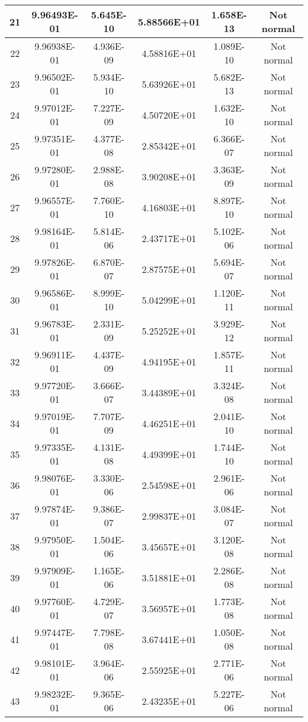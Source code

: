 \begin{table}[h]
\begin{tabular}{|c|c|c|c|c|c|}
		21 & 9.96493E-01 & 5.645E-10 & 5.88566E+01 & 1.658E-13 & Not normal\\\hline
		22 & 9.96938E-01 & 4.936E-09 & 4.58816E+01 & 1.089E-10 & Not normal\\\hline
		23 & 9.96502E-01 & 5.934E-10 & 5.63926E+01 & 5.682E-13 & Not normal\\\hline
		24 & 9.97012E-01 & 7.227E-09 & 4.50720E+01 & 1.632E-10 & Not normal\\\hline
		25 & 9.97351E-01 & 4.377E-08 & 2.85342E+01 & 6.366E-07 & Not normal\\\hline
		26 & 9.97280E-01 & 2.988E-08 & 3.90208E+01 & 3.363E-09 & Not normal\\\hline
		27 & 9.96557E-01 & 7.760E-10 & 4.16803E+01 & 8.897E-10 & Not normal\\\hline
		28 & 9.98164E-01 & 5.814E-06 & 2.43717E+01 & 5.102E-06 & Not normal\\\hline
		29 & 9.97826E-01 & 6.870E-07 & 2.87575E+01 & 5.694E-07 & Not normal\\\hline
		30 & 9.96586E-01 & 8.999E-10 & 5.04299E+01 & 1.120E-11 & Not normal\\\hline
		31 & 9.96783E-01 & 2.331E-09 & 5.25252E+01 & 3.929E-12 & Not normal\\\hline
		32 & 9.96911E-01 & 4.437E-09 & 4.94195E+01 & 1.857E-11 & Not normal\\\hline
		33 & 9.97720E-01 & 3.666E-07 & 3.44389E+01 & 3.324E-08 & Not normal\\\hline
		34 & 9.97019E-01 & 7.707E-09 & 4.46251E+01 & 2.041E-10 & Not normal\\\hline
		35 & 9.97335E-01 & 4.131E-08 & 4.49399E+01 & 1.744E-10 & Not normal\\\hline
		36 & 9.98076E-01 & 3.330E-06 & 2.54598E+01 & 2.961E-06 & Not normal\\\hline
		37 & 9.97874E-01 & 9.386E-07 & 2.99837E+01 & 3.084E-07 & Not normal\\\hline
		38 & 9.97950E-01 & 1.504E-06 & 3.45657E+01 & 3.120E-08 & Not normal\\\hline
		39 & 9.97909E-01 & 1.165E-06 & 3.51881E+01 & 2.286E-08 & Not normal\\\hline
		40 & 9.97760E-01 & 4.729E-07 & 3.56957E+01 & 1.773E-08 & Not normal\\\hline
		41 & 9.97447E-01 & 7.798E-08 & 3.67441E+01 & 1.050E-08 & Not normal\\\hline
		42 & 9.98101E-01 & 3.964E-06 & 2.55925E+01 & 2.771E-06 & Not normal\\\hline
		43 & 9.98232E-01 & 9.365E-06 & 2.43235E+01 & 5.227E-06 & Not normal\\\hline

\end{tabular}
\end{table}
